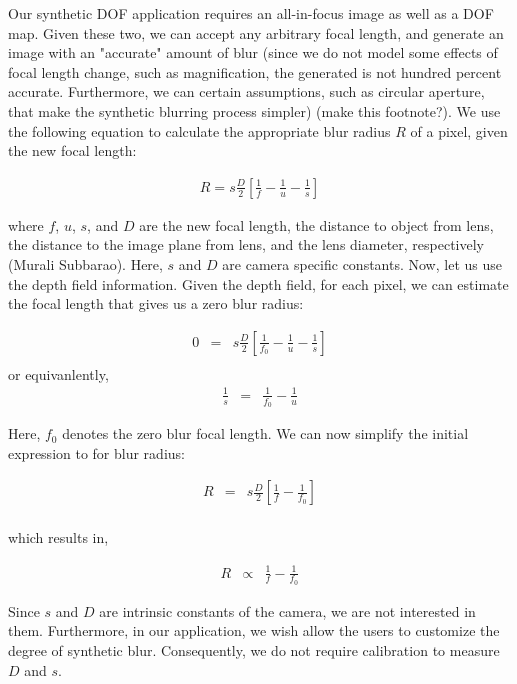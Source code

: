 \documentclass[annual, 12pt]{acmsiggraph}
\begin{document}
Our synthetic DOF application requires an all-in-focus image as well as a DOF map. Given these two, we can accept any arbitrary focal length, and generate an image with an "accurate" amount of blur (since we do not model some effects of focal length change, such as magnification,  the generated is not hundred percent accurate. Furthermore, we can certain assumptions, such as circular aperture, that make the synthetic blurring process simpler) (make this footnote?). We use the following equation to calculate the appropriate blur radius $R$ of a pixel, given the new focal length: 

\begin{eqnarray} 
R=s\frac{D}{2}[\frac{1}{f}-\frac{1}{u}-\frac{1}{s}]
\end{eqnarray}

where $f$, $u$, $s$, and $D$ are the new focal length, the distance to object from lens, the distance to the image plane from lens, and the lens diameter, respectively (Murali Subbarao). Here, $s$ and $D$ are camera specific constants. Now, let us use the depth field information. Given the depth field, for each pixel, we can estimate the focal length that gives us a zero blur radius: 

\begin{eqnarray} 
0 &=& s\frac{D}{2}[\frac{1}{f_{0}}-\frac{1}{u}-\frac{1}{s}] \nonumber \\
\end{eqnarray}
or equivanlently, 
\begin{eqnarray} 
\frac{1}{s} &=& \frac{1}{f_0} - \frac{1}{u} 
\end{eqnarray}

Here, $f_0$ denotes the zero blur focal length. We can now simplify the initial expression to for blur radius:

\begin{eqnarray} 
R &=& s\frac{D}{2}[\frac{1}{f}-\frac{1}{f_0}] \nonumber \\
\end{eqnarray}

which results in,

\begin{eqnarray} 
R &\propto& \frac{1}{f}-\frac{1}{f_{0}}
\end{eqnarray}
 
Since $s$ and $D$ are intrinsic constants of the camera, we are not interested in them. Furthermore, in our application, we wish allow the users to customize the degree of synthetic blur. Consequently, we do not require calibration to measure $D$ and $s$. 
\end{document}
